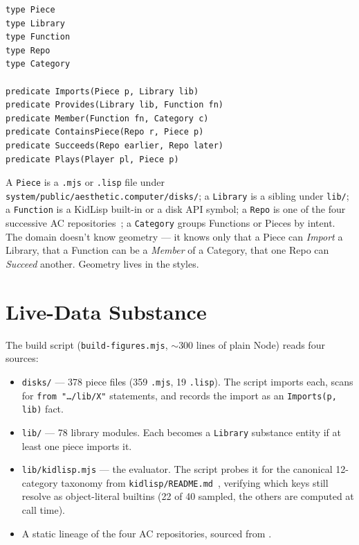 \documentclass[10pt,letterpaper,twocolumn]{article}
\begin{document}
\begin{lstlisting}[language=penrose]
type Piece
type Library
type Function
type Repo
type Category

predicate Imports(Piece p, Library lib)
predicate Provides(Library lib, Function fn)
predicate Member(Function fn, Category c)
predicate ContainsPiece(Repo r, Piece p)
predicate Succeeds(Repo earlier, Repo later)
predicate Plays(Player pl, Piece p)
\end{lstlisting}

A \texttt{Piece} is a \texttt{.mjs} or \texttt{.lisp} file under \texttt{system/public/aesthetic.computer/disks/}; a \texttt{Library} is a sibling under \texttt{lib/}; a \texttt{Function} is a KidLisp built-in or a disk API symbol; a \texttt{Repo} is one of the four successive AC repositories~\citep{scudder2026archaeology}; a \texttt{Category} groups Functions or Pieces by intent. The domain doesn't know geometry --- it knows only that a Piece can \emph{Import} a Library, that a Function can be a \emph{Member} of a Category, that one Repo can \emph{Succeed} another. Geometry lives in the styles.


\section{Live-Data Substance}

The build script (\texttt{build-figures.mjs}, $\sim$300 lines of plain Node) reads four sources:

\begin{itemize}
  \item \texttt{disks/} --- 378 piece files (359 \texttt{.mjs}, 19 \texttt{.lisp}). The script imports each, scans for \texttt{from "\ldots/lib/X"} statements, and records the import as an \texttt{Imports(p, lib)} fact.
  \item \texttt{lib/} --- 78 library modules. Each becomes a \texttt{Library} substance entity if at least one piece imports it.
  \item \texttt{lib/kidlisp.mjs} --- the evaluator. The script probes it for the canonical 12-category taxonomy from \texttt{kidlisp/README.md}~\citep{scudder2026kidlisp-reference}, verifying which keys still resolve as object-literal builtins (22 of 40 sampled, the others are computed at call time).
  \item A static lineage of the four AC repositories, sourced from \citet{scudder2026archaeology}.
\end{itemize}
\end{document}
